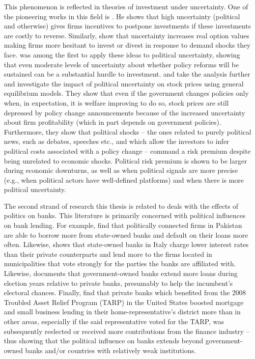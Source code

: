 \documentclass[12pt,a4paper]{article}
\begin{document}
This phenomenon is reflected in theories of investment under uncertainty. One of the pioneering works in this field is \citet{bernanke1983irreversibility}. He shows that high uncertainty (political and otherwise) gives firms incentives to postpone investments if these investments are costly to reverse. Similarly, \citet{bloom2007uncertainty} show that uncertainty increases real option values making firms more hesitant to invest or divest in response to demand shocks they face. \citet{rodrik1991policy} was among the first to apply these ideas to political uncertainty, showing that even moderate levels of uncertainty about whether policy reforms will be sustained can be a substantial hurdle to investment. \citet{pastor2012uncertainty} and \citet{pastor2013political} take the analysis further and investigate the impact of political uncertainty on stock prices using general equilibrium models. They show that even if the government changes policies only when, in expectation, it is welfare improving to do so, stock prices are still depressed by policy change announcements because of the increased uncertainty about firm profitability (which in part depends on government policies). Furthermore, they show that political shocks -- the ones related to purely political news, such as debates, speeches etc., and which allow the investors to infer political costs associated with a policy change -- command a risk premium despite being unrelated to economic shocks. Political risk premium is shown to be larger during economic downturns, as well as when political signals are more precise (e.g., when political actors have well-defined platforms) and when there is more political uncertainty.

The second strand of research this thesis is related to deals with the effects of politics on banks. This literature is primarily concerned with political influences on bank lending. For example, \citet{khwaja2005lenders} find that politically connected firms in Pakistan are able to borrow more from state-owned banks and default on their loans more often. Likewise, \citet{sapienza2004effects} shows that state-owned banks in Italy charge lower interest rates than their private counterparts and lend more to the firms located in municipalities that vote strongly for the  parties the banks are affiliated with. Likewise, \citet{dincc2005politicians} documents that government-owned banks extend more loans during election years relative to private banks, presumably to help the incumbent's electoral chances. Finally, \citet{chavaz2016political} find that private banks which benefited from the 2008 Troubled Asset Relief Program (TARP) in the United States boosted mortgage and small business lending in their home-representative's district more than in other areas, especially if the said representative voted for the TARP, was subsequently reelected or received more contributions from the finance industry -- thus showing that the political influence on banks extends beyond government-owned banks and/or countries with relatively weak institutions.
\end{document}
